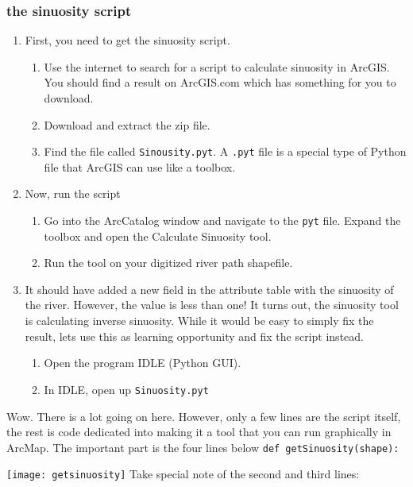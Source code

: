 \documentclass{article}
\begin{document}
\subsubsection{the sinuosity script}
\begin{enumerate}
    \item First, you need to get the sinuosity script.
        \begin{enumerate}
            \item Use the internet to search for a script to calculate sinuosity in ArcGIS.  You should find a result on ArcGIS.com which has something for you to download.
            \item Download and extract the zip file.  
            \item Find the file called \verb+Sinousity.pyt+.  A \verb+.pyt+ file is a special type of Python file that ArcGIS can use like a toolbox.  
        \end{enumerate}
    \item Now, run the script
        \begin{enumerate}
            \item Go into the ArcCatalog window and navigate to the \verb+pyt+ file.  Expand the toolbox and open the Calculate Sinuosity tool.  
            \item Run the tool on your digitized river path shapefile.  
        \end{enumerate}
    \item It should have added a new field in the attribute table with the sinuosity of the river.  However, the value is less than one!  It turns out, the sinuosity tool is calculating inverse sinuosity.  While it would be easy to simply fix the result, lets use this as learning opportunity and fix the script instead.  
        \begin{enumerate}
            \item Open the program IDLE (Python GUI).
            \item In IDLE, open up \verb+Sinuosity.pyt+
        \end{enumerate}
\end{enumerate}

Wow.  There is a lot going on here.  However, only a few lines are the script itself, the rest is code dedicated into making it a tool that you can run graphically in ArcMap.  The important part is the four lines below \verb+def getSinuosity(shape):+

\noindent
\texttt{[image: getsinuosity]}
Take special note of the second and third lines:
\end{document}
